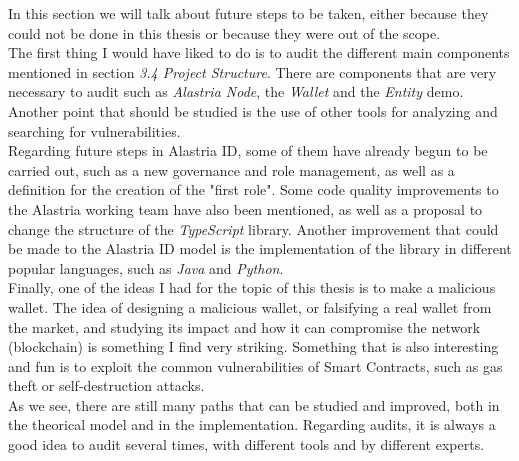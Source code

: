 In this section we will talk about future steps to be taken, either because they could not be done in this thesis or because they were out of the scope.\\

The first thing I would have liked to do is to audit the different main components mentioned in section \textit{3.4 Project Structure}. There are components that are very necessary to audit such as \textit{Alastria Node}, the \textit{Wallet} and the \textit{Entity} demo. Another point that should be studied is the use of other tools for analyzing and searching for vulnerabilities.\\

Regarding future steps in Alastria ID, some of them have already begun to be carried out, such as a new governance and role management, as well as a definition for the creation of the "first role". Some code quality improvements to the Alastria working team have also been mentioned, as well as a proposal to change the structure of the \textit{TypeScript} library. Another improvement that could be made to the Alastria ID model is the implementation of the library in different popular languages, such as \textit{Java} and \textit{Python}.\\

Finally, one of the ideas I had for the topic of this thesis is to make a malicious wallet. The idea of designing a malicious wallet, or falsifying a real wallet from the market, and studying its impact and how it can compromise the network (blockchain) is something I find very striking. Something that is also interesting and fun is to exploit the common vulnerabilities of Smart Contracts, such as gas theft or self-destruction attacks.\\

As we see, there are still many paths that can be studied and improved, both in the theorical model and in the implementation. Regarding audits, it is always a good idea to audit several times, with different tools and by different experts.

